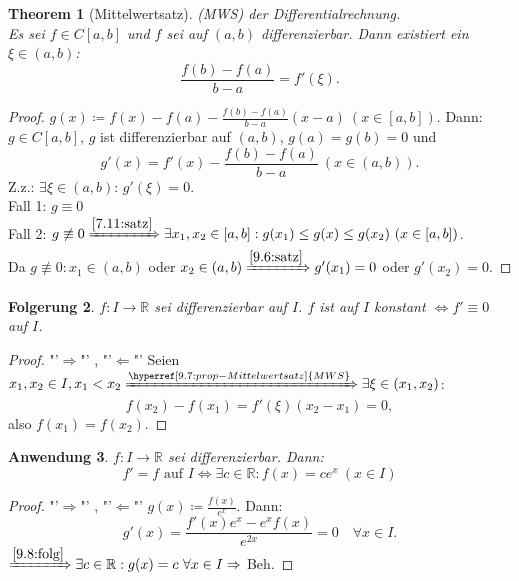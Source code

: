 \documentclass[titlepage,ngerman,a4paper,headsepline]{scrartcl}
\newcommand{\R}{\mathbb{R}}
\theoremstyle{named}
\newtheorem{namedtheorem}{Theorem} \counterwithin{namedtheorem}{section}
\theoremstyle{dotless}
\newtheorem{folgerung}[namedtheorem]{Folgerung}
\newtheorem{anwendung}[namedtheorem]{Anwendung}
\begin{document}
\begin{namedtheorem}[Mittelwertsatz] \label{9.7:prop-Mittelwertsatz}
	(MWS) der Differentialrechnung. \\
	Es sei $f \in C[a, b]$ und $f$ sei auf $(a, b)$ differenzierbar. Dann existiert ein $\xi \in (a, b)$:
	$$ \frac{f(b) - f(a)}{b - a} = f'(\xi). $$
\end{namedtheorem}

\begin{proof}
	$g(x) \coloneqq f(x) - f(a) - \frac{f(b) - f(a)}{b - a} (x - a) ~(x \in [a, b])$. Dann: $g \in C[a, b]$, $g$ ist differenzierbar auf $(a, b)$, $g(a) = g(b) = 0$ und 
		$$ g'(x) = f'(x) - \frac{f(b) - f(a)}{b - a} ~(x \in (a, b)). $$
	Z.z.: $\exists \xi \in (a, b)$: $g'(\xi) = 0$. \\
	Fall 1: $g \equiv 0$ \checkmark \\
	Fall 2: $g \not\equiv 0 \xRightarrow[]{\ref{7.11:satz}} \exists x_{1}, x_{2} \in [a, b]: g(x_{1}) \leq g(x) \leq g(x_{2}) ~(x \in [a, b])$. \\
	Da $g \not\equiv 0: x_{1} \in (a, b)$ oder $x_{2} \in (a, b) \xRightarrow[]{\ref{9.6:satz}} g'(x_{1}) = 0$ oder $g'(x_{2}) = 0$.
\end{proof}


\begin{folgerung} \label{9.8:folg}
	$f \colon I \rightarrow \R$ sei differenzierbar auf $I$. $f$ ist auf $I$ konstant $\iff f' \equiv 0$ auf $I$.	
\end{folgerung}

\begin{proof}
	"'$\Rightarrow$"' \checkmark, "'$\Leftarrow$"' Seien $x_{1}, x_{2} \in I, x_{1} < x_{2} \xRightarrow[]{\hyperref[9.7:prop-Mittelwertsatz]{MWS}} \exists \xi \in (x_{1}, x_{2})$: 
		$$ f(x_{2}) - f(x_{1}) = f'(\xi) (x_{2} - x_{1}) = 0, $$ 
	also $f(x_{1}) = f(x_{2})$.
\end{proof}


\begin{anwendung} \label{9.9:anwendung}
	$f \colon I \rightarrow \R$ sei differenzierbar. Dann: 
		$$ f' = f \text{ auf } I \iff \exists c \in \R: f(x) = c e^{x} ~(x \in I) $$
\end{anwendung}

\begin{proof}
	"'$\Rightarrow$"' \checkmark, "'$\Leftarrow$"' $g(x) \coloneqq \frac{f(x)}{e^{x}}$. Dann:
	$$ g'(x) = \frac{f'(x) e^{x} - e^{x} f(x)}{e^{2x}} = 0 \quad \forall x \in I. $$
	$\xRightarrow[]{\ref{9.8:folg}} \exists c \in \R: g(x) = c ~\forall x \in I \Rightarrow$ Beh.
\end{proof}
\end{document}
